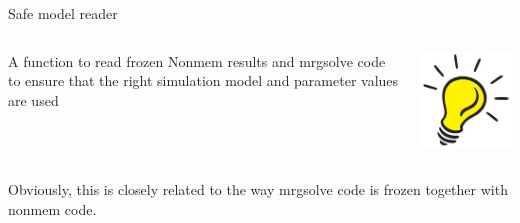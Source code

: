 \documentclass[
  8pt,
  ignorenonframetext,
  aspectratio=169]{beamer}
\begin{document}
\begin{frame}{Safe model reader}
\protect\hypertarget{safe-model-reader}{}
\begin{columns}[T]
\begin{column}{0.85\textwidth}
A function to read frozen Nonmem results and mrgsolve code to ensure
that the right simulation model and parameter values are used
\end{column}

\begin{column}{0.15\textwidth}
\includegraphics[width=.5in]{figures/ideabulb.jpg}
\end{column}
\end{columns}

Obviously, this is closely related to the way mrgsolve code is frozen
together with nonmem code.
\end{frame}
\end{document}
